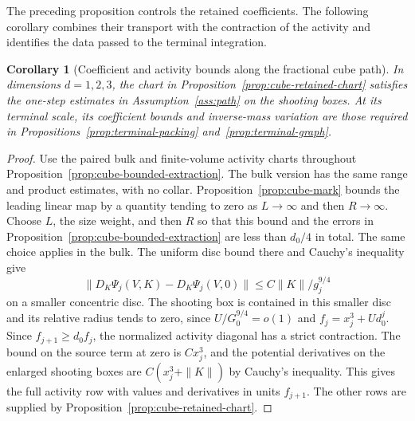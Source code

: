 \documentclass[11pt]{article}
\newtheorem{corollary}[theorem]{Corollary}
\theoremstyle{definition}
\begin{document}
The preceding proposition controls the retained coefficients. The
following corollary combines their transport with the contraction
of the activity and identifies the data passed to the terminal
integration.

\begin{corollary}[Coefficient and activity bounds along the fractional cube path]
\label{cor:fractional-cube-path}
In dimensions \(d=1,2,3\), the chart in
Proposition~\ref{prop:cube-retained-chart} satisfies the one-step
estimates in Assumption~\ref{ass:path} on the shooting boxes.
At its terminal scale, its coefficient bounds and inverse-mass
variation are those required in
Propositions~\ref{prop:terminal-packing} and~\ref{prop:terminal-graph}.
\end{corollary}

\begin{proof}
Use the paired bulk and finite-volume activity charts throughout
Proposition~\ref{prop:cube-bounded-extraction}. The bulk version has
the same range and product estimates, with no collar.
Proposition~\ref{prop:cube-mark} bounds the leading linear map by a
quantity tending to zero as \(L\to\infty\) and then \(R\to\infty\).
Choose \(L\), the size weight, and then \(R\) so that this bound
and the errors in Proposition~\ref{prop:cube-bounded-extraction}
are less than \(d_0/4\) in total. The same choice applies in the
bulk. The uniform disc bound there and Cauchy's inequality give
\begin{equation}
 \|D_K\Psi_j(V,K)-D_K\Psi_j(V,0)\|
       \le C\|K\|/g_j^{9/4}
\end{equation}
on a smaller concentric disc. The shooting box is contained in
this smaller disc and its relative radius tends to zero, since
\(U/G_0^{9/4}=o(1)\) and \(f_j=x_j^3+Ud_0^j\).
Since \(f_{j+1}\ge d_0 f_j\), the normalized activity diagonal
has a strict contraction. The bound on the source term at zero
is \(C x_j^3\), and the potential derivatives on the enlarged
shooting boxes are \(C(x_j^3+\|K\|)\) by Cauchy's inequality.
This gives the full activity row with values and derivatives in
units \(f_{j+1}\). The other rows are supplied by
Proposition~\ref{prop:cube-retained-chart}.


\end{proof}
\end{document}
